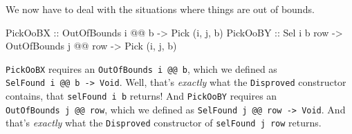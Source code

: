\documentclass[]{article}
\newenvironment{Shaded}{}{}
\newcommand{\DataTypeTok}[1]{\textcolor[rgb]{0.56,0.13,0.00}{#1}}
\newcommand{\NormalTok}[1]{#1}
\newcommand{\OperatorTok}[1]{\textcolor[rgb]{0.40,0.40,0.40}{#1}}
\newcommand{\OtherTok}[1]{\textcolor[rgb]{0.00,0.44,0.13}{#1}}
\begin{document}
We now have to deal with the situations where things are out of bounds.

\begin{Shaded}
\begin{Highlighting}[]
\DataTypeTok{PickOoBX}\OtherTok{ ::} \DataTypeTok{OutOfBounds}\NormalTok{ i }\OperatorTok{@@}\NormalTok{ b}
         \OtherTok{{-}>} \DataTypeTok{Pick}\NormalTok{ \textquotesingle{}(i, j, b)}
\DataTypeTok{PickOoBY}\OtherTok{ ::} \DataTypeTok{Sel}\NormalTok{ i b row}
         \OtherTok{{-}>} \DataTypeTok{OutOfBounds}\NormalTok{ j }\OperatorTok{@@}\NormalTok{ row}
         \OtherTok{{-}>} \DataTypeTok{Pick}\NormalTok{ \textquotesingle{}(i, j, b)}
\end{Highlighting}
\end{Shaded}

\texttt{PickOoBX} requires an \texttt{OutOfBounds\ i\ @@\ b}, which we defined
as \texttt{SelFound\ i\ @@\ b\ -\textgreater{}\ Void}. Well, that's
\emph{exactly} what the \texttt{Disproved} constructor contains, that
\texttt{selFound\ i\ b} returns! And \texttt{PickOoBY} requires an
\texttt{OutOfBounds\ j\ @@\ row}, which we defined as
\texttt{SelFound\ j\ @@\ row\ -\textgreater{}\ Void}. And that's \emph{exactly}
what the \texttt{Disproved} constructor of \texttt{selFound\ j\ row} returns.
\end{document}
